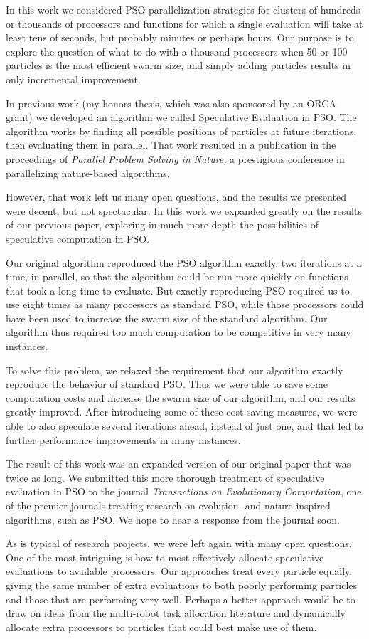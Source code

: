 \documentclass[onecolumn, 12pt]{article}
\begin{document}
In this work we considered PSO parallelization strategies for clusters of
hundreds or thousands of processors and functions for which a single evaluation
will take at least tens of seconds, but probably minutes or perhaps hours.  Our
purpose is to explore the question of what to do with a thousand processors
when 50 or 100 particles is the most efficient swarm size, and simply adding
particles results in only incremental improvement.

In previous work (my honors thesis, which was also sponsored by an ORCA grant)
we developed an algorithm we called Speculative Evaluation in PSO.  The
algorithm works by finding all possible positions of particles at future
iterations, then evaluating them in parallel.  That work resulted in a
publication in the proceedings of \emph{Parallel Problem Solving in Nature,} a
prestigious conference in parallelizing nature-based algorithms.

However, that work left us many open questions, and the results we presented
were decent, but not spectacular.  In this work we expanded greatly on the
results of our previous paper, exploring in much more depth the possibilities
of speculative computation in PSO.

Our original algorithm reproduced the PSO algorithm exactly, two iterations at
a time, in parallel, so that the algorithm could be run more quickly on
functions that took a long time to evaluate.  But exactly reproducing PSO
required us to use eight times as many processors as standard PSO, while those
processors could have been used to increase the swarm size of the standard
algorithm.  Our algorithm thus required too much computation to be competitive
in very many instances.

To solve this problem, we relaxed the requirement that our algorithm exactly
reproduce the behavior of standard PSO.  Thus we were able to save some
computation costs and increase the swarm size of our algorithm, and our results
greatly improved.  After introducing some of these cost-saving measures, we
were able to also speculate several iterations ahead, instead of just one, and
that led to further performance improvements in many instances.

The result of this work was an expanded version of our original paper that was
twice as long.  We submitted this more thorough treatment of speculative
evaluation in PSO to the journal \emph{Transactions on Evolutionary
Computation}, one of the premier journals treating research on evolution- and 
nature-inspired algorithms, such as PSO.  We hope to hear a response from the
journal soon.

As is typical of research projects, we were left again with many open
questions.  One of the most intriguing is how to most effectively allocate
speculative evaluations to available processors.  Our approaches treat every
particle equally, giving the same number of extra evaluations to both poorly
performing particles and those that are performing very well.  Perhaps a better
approach would be to draw on ideas from the multi-robot task allocation
literature and dynamically allocate extra processors to particles that could
best make use of them.



\end{document}
